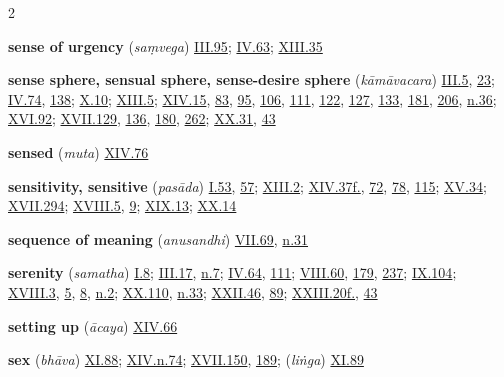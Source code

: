 \begin{multicols}{2}
\begin{vismHanging}
\par\textbf{sense of urgency} (\emph{saṃvega}) \hyperlink{III.95}{III.95}{}; \hyperlink{IV.63}{IV.63}{}; \hyperlink{XIII.35}{XIII.35}{}
\par\textbf{sense sphere, sensual sphere, sense-desire sphere} (\emph{kāmāvacara}) \hyperlink{III.5}{III.5}{}, \hyperlink{III.23}{23}{}; \hyperlink{IV.74}{IV.74}{}, \hyperlink{IV.138}{138}{}; \hyperlink{X.10}{X.10}{}; \hyperlink{XIII.5}{XIII.5}{}; \hyperlink{XIV.15}{XIV.15}{}, \hyperlink{XIV.83}{83}{}, \hyperlink{XIV.95}{95}{}, \hyperlink{XIV.106}{106}{}, \hyperlink{XIV.111}{111}{}, \hyperlink{XIV.122}{122}{}, \hyperlink{XIV.127}{127}{}, \hyperlink{XIV.133}{133}{}, \hyperlink{XIV.181}{181}{}, \hyperlink{XIV.206}{206}{}, \hyperlink{XIV.n36}{n.36}{}; \hyperlink{XVI.92}{XVI.92}{}; \hyperlink{XVII.129}{XVII.129}{}, \hyperlink{XVII.136}{136}{}, \hyperlink{XVII.180}{180}{}, \hyperlink{XVII.262}{262}{}; \hyperlink{XX.31}{XX.31}{}, \hyperlink{XX.43}{43}{}
\par\textbf{sensed} (\emph{muta}) \hyperlink{XIV.76}{XIV.76}{}
\par\textbf{sensitivity, sensitive} (\emph{pasāda}) \hyperlink{I.53}{I.53}{}, \hyperlink{I.57}{57}{}; \hyperlink{XIII.2}{XIII.2}{}; \hyperlink{XIV.37}{XIV.37f.}{}, \hyperlink{XIV.72}{72}{}, \hyperlink{XIV.78}{78}{}, \hyperlink{XIV.115}{115}{}; \hyperlink{XV.34}{XV.34}{}; \hyperlink{XVII.294}{XVII.294}{}; \hyperlink{XVIII.5}{XVIII.5}{}, \hyperlink{XVIII.9}{9}{}; \hyperlink{XIX.13}{XIX.13}{}; \hyperlink{XX.14}{XX.14}{}
\par\textbf{sequence of meaning} (\emph{anusandhi}) \hyperlink{VII.69}{VII.69}{}, \hyperlink{VII.n31}{n.31}{}
\par\textbf{serenity} (\emph{samatha}) \hyperlink{I.8}{I.8}{}; \hyperlink{III.17}{III.17}{}, \hyperlink{III.n7}{n.7}{}; \hyperlink{IV.64}{IV.64}{}, \hyperlink{IV.111}{111}{}; \hyperlink{VIII.60}{VIII.60}{}, \hyperlink{VIII.179}{179}{}, \hyperlink{VIII.237}{237}{}; \hyperlink{IX.104}{IX.104}{}; \hyperlink{XVIII.3}{XVIII.3}{}, \hyperlink{XVIII.5}{5}{}, \hyperlink{XVIII.8}{8}{}, \hyperlink{XVIII.n2}{n.2}{}; \hyperlink{XX.110}{XX.110}{}, \hyperlink{XX.n33}{n.33}{}; \hyperlink{XXII.46}{XXII.46}{}, \hyperlink{XXII.89}{89}{}; \hyperlink{XXIII.20}{XXIII.20f.}{}, \hyperlink{XXIII.43}{43}{}
\par\textbf{setting up} (\emph{ācaya}) \hyperlink{XIV.66}{XIV.66}{}
\par\textbf{sex} (\emph{bhāva}) \hyperlink{XI.88}{XI.88}{}; \hyperlink{XIV.n74}{XIV.n.74}{}; \hyperlink{XVII.150}{XVII.150}{}, \hyperlink{XVII.189}{189}{}; (\emph{liṅga}) \hyperlink{XI.89}{XI.89}{}

\end{vismHanging}
\end{multicols}
